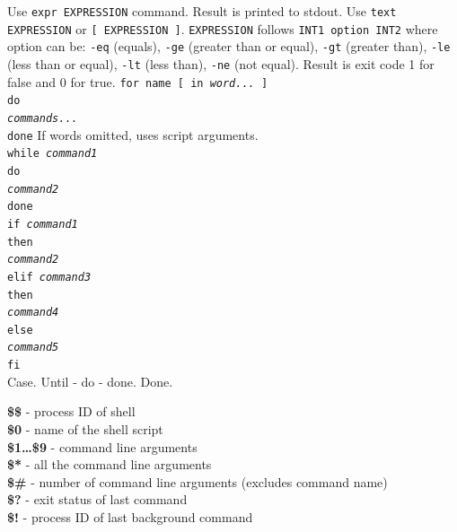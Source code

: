 \documentclass[number]{notes}
\begin{document}
\begin{landscape}
\begin{multicols}{3}
Use \texttt{expr EXPRESSION} command. Result is printed to stdout.
Use \texttt{text EXPRESSION} or \texttt{[ EXPRESSION ]}. \texttt{EXPRESSION} follows \texttt{INT1 option INT2} where option can be: \texttt{-eq} (equals), \texttt{-ge} (greater than or equal), \texttt{-gt} (greater than), \texttt{-le} (less than or equal), \texttt{-lt} (less than), \texttt{-ne} (not equal). Result is exit code 1 for false and 0 for true.
\texttt{for name [ in \textit{word...} ]\\do\\\textit{commands...}\\done}
If words omitted, uses script arguments.\\
\texttt{while \textit{command1}\\do\\\textit{command2}\\done}\\
\texttt{if \textit{command1}\\then\\\textit{command2}\\elif \textit{command3}\\then\\\textit{command4}\\else\\\textit{command5}\\fi}\\
Case. Until - do - done. Done.


\textbf{\$\$} - process ID of shell\\
\textbf{\$0} - name of the shell script\\
\textbf{\$1\ldots\$9} - command line arguments\\
\textbf{\$*} - all the command line arguments\\
\textbf{\$\#} - number of command line arguments (excludes command name)\\
\textbf{\$?} - exit status of last command\\
\textbf{\$!} - process ID of last background command


\end{multicols}
\end{landscape}
\end{document}
